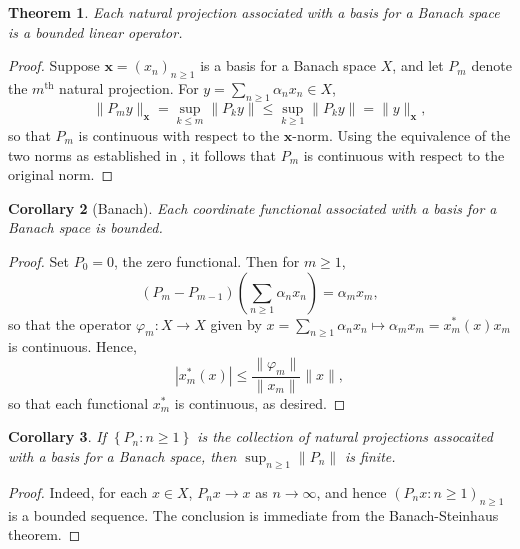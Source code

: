 \documentclass[11pt]{article}
\theoremstyle{thmstyle}
\newtheorem{theorem}{Theorem}[section]
\theoremstyle{defstyle}
\newtheorem{corollary}[theorem]{Corollary}
\renewcommand{\le}{\leqslant}
\renewcommand{\ge}{\geqslant}
\begin{document}
\begin{theorem}
	Each natural projection associated with a basis for a Banach space is a bounded linear operator.
\end{theorem}
\begin{proof}
	Suppose $\mathbf x = (x_n)_{n\ge 1}$ is a basis for a Banach space $X$, and let $P_m$ denote the $m^{\text{th}}$ natural projection. For $y = \displaystyle\sum_{n\ge 1}\alpha_n x_n\in X$, 
	\begin{equation*}
		\|P_m y\|_{\mathbf x} = \sup_{k\le m}\|P_k y\|\le\sup_{k\ge 1}\|P_k y\| = \|y\|_{\mathbf x},
	\end{equation*}
	so that $P_m$ is continuous with respect to the $\mathbf x$-norm. Using the equivalence of the two norms as established in , it follows that $P_m$ is continuous with respect to the original norm. 
\end{proof}

\begin{corollary}[Banach]
	Each coordinate functional associated with a basis for a Banach space is bounded.
\end{corollary}
\begin{proof}
	Set $P_0 = 0$, the zero functional. Then for $m\ge 1$, 
	\begin{equation*}
		(P_m - P_{m - 1})\left(\sum_{n\ge 1} \alpha_nx_n\right) = \alpha_m x_m,
	\end{equation*}
	so that the operator $\varphi_m\colon X\to X$ given by  $x = \displaystyle\sum_{n\ge 1}\alpha_n x_n\longmapsto \alpha_m x_m = x_m^\ast(x)x_m$ is continuous. Hence, 
	\begin{equation*}
		\left|x_m^\ast (x)\right|\le\frac{\|\varphi_m\|}{\|x_m\|}\|x\|,
	\end{equation*}
	so that each functional $x_m^\ast$ is continuous, as desired.
\end{proof}

\begin{corollary}
	If $\left\{P_n\colon n\ge 1\right\}$ is the collection of natural projections assocaited with a basis for a Banach space, then $\displaystyle\sup_{n\ge 1}\|P_n\|$ is finite.
\end{corollary}
\begin{proof}
	Indeed, for each $x\in X$, $P_n x\to x$ as $n\to\infty$, and hence $\left(P_n x\colon n\ge 1\right)_{n\ge 1}$ is a bounded sequence. The conclusion is immediate from the Banach-Steinhaus theorem.
\end{proof}
\end{document}
